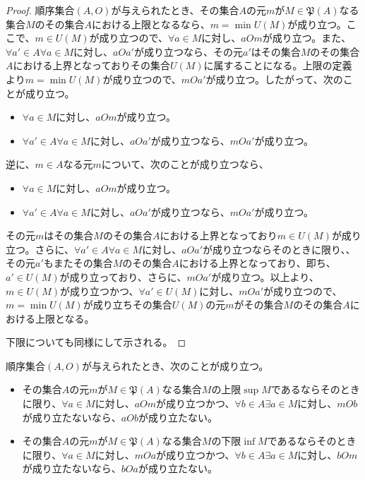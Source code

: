 \documentclass[dvipdfmx]{jsarticle}
\begin{document}
\begin{proof}
順序集合$(A,O)$が与えられたとき、その集合$A$の元$m$が$M \in \mathfrak{P}(A)$なる集合$M$のその集合$A$における上限となるなら、$m = \min{U(M)}$が成り立つ。ここで、$m \in U(M)$が成り立つので、$\forall a \in M$に対し、$aOm$が成り立つ。また、$\forall a' \in A\forall a \in M$に対し、$aOa'$が成り立つなら、その元$a'$はその集合$M$のその集合$A$における上界となっておりその集合$U(M)$に属することになる。上限の定義より$m = \min{U(M)}$が成り立つので、$mOa'$が成り立つ。したがって、次のことが成り立つ。
\begin{itemize}
\item
  $\forall a \in M$に対し、$aOm$が成り立つ。
\item
  $\forall a' \in A\forall a \in M$に対し、$aOa'$が成り立つなら、$mOa'$が成り立つ。
\end{itemize}\par
逆に、$m \in A$なる元$m$について、次のことが成り立つなら、
\begin{itemize}
\item
  $\forall a \in M$に対し、$aOm$が成り立つ。
\item
  $\forall a' \in A\forall a \in M$に対し、$aOa'$が成り立つなら、$mOa'$が成り立つ。
\end{itemize}
その元$m$はその集合$M$のその集合$A$における上界となっており$m \in U(M)$が成り立つ。さらに、$\forall a' \in A\forall a \in M$に対し、$aOa'$が成り立つならそのときに限り、、その元$a'$もまたその集合$M$のその集合$A$における上界となっており、即ち、$a' \in U(M)$が成り立っており、さらに、$mOa'$が成り立つ。以上より、$m \in U(M)$が成り立つかつ、$\forall a' \in U(M)$に対し、$mOa'$が成り立つので、$m = \min{U(M)}$が成り立ちその集合$U(M)$の元$m$がその集合$M$のその集合$A$における上限となる。\par
下限についても同様にして示される。
\end{proof}
\begin{thm}\label{1.3.1.9}
順序集合$(A,O)$が与えられたとき、次のことが成り立つ。
\begin{itemize}
\item
  その集合$A$の元$m$が$M \in \mathfrak{P}(A)$なる集合$M$の上限$\sup M$であるならそのときに限り、$\forall a \in M$に対し、$aOm$が成り立つかつ、$\forall b \in A\exists a \in M$に対し、$mOb$が成り立たないなら、$aOb$が成り立たない。
\item
  その集合$A$の元$m$が$M \in \mathfrak{P}(A)$なる集合$M$の下限$\inf M$であるならそのときに限り、$\forall a \in M$に対し、$mOa$が成り立つかつ、$\forall b \in A\exists a \in M$に対し、$bOm$が成り立たないなら、$bOa$が成り立たない。
\end{itemize}
\end{thm}
\end{document}

